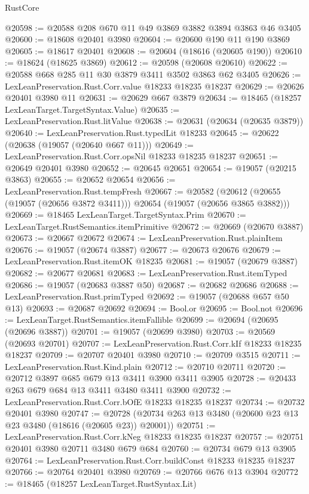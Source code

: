 \begin{lexlean}{RustCore}
\begin{coremodule}
@20598 := @20588 @208 @670 @11 @49 @3869 @3882 @3894 @3863 @46 @3405
@20600 := @18608 @20401 @3980
@20604 := @20600 @190 @11 @190 @3869
@20605 := @18617 @20401
@20608 := @20604 (@18616 (@20605 @190))
@20610 := @18624 (@18625 @3869)
@20612 := @20598 (@20608 @20610)
@20622 := @20588 @668 @285 @11 @30 @3879 @3411 @3502 @3863 @62 @3405
@20626 := LexLeanPreservation.Rust.Corr.value @18233 @18235 @18237
@20629 := @20626 @20401 @3980 @11
@20631 := @20629 @667 @3879
@20634 := @18465 (@18257 LexLeanTarget.TargetSyntax.Value)
@20635 := LexLeanPreservation.Rust.litValue
@20638 := @20631 (@20634 (@20635 @3879))
@20640 := LexLeanPreservation.Rust.typedLit @18233
@20645 := @20622 (@20638 (@19057 (@20640 @667 @11)))
@20649 := LexLeanPreservation.Rust.Corr.opsNil @18233 @18235 @18237
@20651 := @20649 @20401 @3980
@20652 := @20645 @20651
@20654 := @19057 (@20215 @3863)
@20655 := @20652 @20654
@20656 := LexLeanPreservation.Rust.tempFresh
@20667 := @20582
    (@20612 (@20655 (@19057 (@20656 @3872 @3411))) @20654 (@19057 (@20656 @3865 @3882)))
@20669 := @18465 LexLeanTarget.TargetSyntax.Prim
@20670 := LexLeanTarget.RustSemantics.itemPrimitive
@20672 := @20669 (@20670 @3887)
@20673 := @20667 @20672
@20674 := LexLeanPreservation.Rust.plainItem
@20676 := @19057 (@20674 @3887)
@20677 := @20673 @20676
@20679 := LexLeanPreservation.Rust.itemOK @18235
@20681 := @19057 (@20679 @3887)
@20682 := @20677 @20681
@20683 := LexLeanPreservation.Rust.itemTyped
@20686 := @19057 (@20683 @3887 @50)
@20687 := @20682 @20686
@20688 := LexLeanPreservation.Rust.primTyped
@20692 := @19057 (@20688 @657 @50 @13)
@20693 := @20687 @20692
@20694 := Bool.or
@20695 := Bool.not
@20696 := LexLeanTarget.RustSemantics.itemFallible
@20699 := @20694 (@20695 (@20696 @3887))
@20701 := @19057 (@20699 @3980)
@20703 := @20569 (@20693 @20701)
@20707 := LexLeanPreservation.Rust.Corr.kIf @18233 @18235 @18237
@20709 := @20707 @20401 @3980
@20710 := @20709 @3515
@20711 := LexLeanPreservation.Rust.Kind.plain
@20712 := @20710 @20711
@20720 := @20712 @3897 @685 @679 @13 @3411 @3900 @3411 @3905
@20728 := @20433 @263 @679 @684 @13 @3411 @3480 @3411 @3900
@20732 := LexLeanPreservation.Rust.Corr.bOfE @18233 @18235 @18237
@20734 := @20732 @20401 @3980
@20747 := @20728 (@20734 @263 @13 @3480 (@20600 @23 @13 @23 @3480 (@18616 (@20605 @23)) @20001))
@20751 := LexLeanPreservation.Rust.Corr.kNeg @18233 @18235 @18237
@20757 := @20751 @20401 @3980 @20711 @3480 @679 @684
@20760 := @20734 @679 @13 @3905
@20764 := LexLeanPreservation.Rust.Corr.buildConst @18233 @18235 @18237
@20766 := @20764 @20401 @3980
@20769 := @20766 @676 @13 @3904
@20772 := @18465 (@18257 LexLeanTarget.RustSyntax.Lit)

\end{coremodule}
\end{lexlean}
